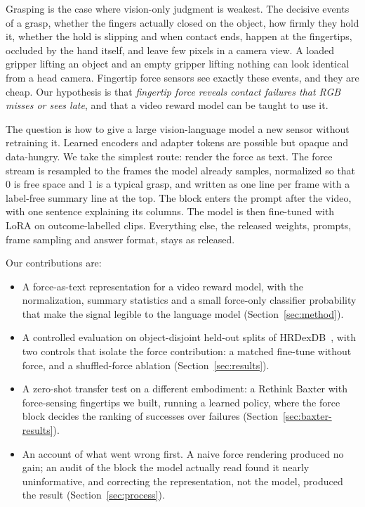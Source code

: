 \documentclass{article}
\begin{document}
Grasping is the case where vision-only judgment is weakest. The decisive events of a grasp, whether
the fingers actually closed on the object, how firmly they hold it, whether the hold is slipping
and when contact ends, happen at the fingertips, occluded by the hand itself, and leave few
pixels in a camera view. A loaded gripper lifting an object and an empty gripper lifting nothing
can look identical from a head camera. Fingertip force sensors see exactly these events, and they
are cheap. Our hypothesis is that \emph{fingertip force reveals contact failures that RGB misses or
sees late}, and that a video reward model can be taught to use it.

The question is how to give a large vision-language model a new sensor without retraining it.
Learned encoders and adapter tokens are possible but opaque and data-hungry. We take the
simplest route: render the force as text. The force stream is resampled to the frames the model
already samples, normalized so that 0 is free space and 1 is a typical grasp, and written as one
line per frame with a label-free summary line at the top. The block enters the prompt after the
video, with one sentence explaining its columns. The model is then fine-tuned with LoRA on
outcome-labelled clips. Everything else, the released weights, prompts, frame sampling and answer
format, stays as released.

Our contributions are:
\begin{itemize}
  \item A force-as-text representation for a video reward model, with the normalization,
  summary statistics and a small force-only classifier probability that make the signal legible
  to the language model (Section~\ref{sec:method}).
  \item A controlled evaluation on object-disjoint held-out splits of HRDexDB~\cite{hrdexdb2026},
  with two controls that isolate the force contribution: a matched fine-tune without force, and
  a shuffled-force ablation (Section~\ref{sec:results}).
  \item A zero-shot transfer test on a different embodiment: a Rethink Baxter with force-sensing
  fingertips we built, running a learned policy, where the force block decides the ranking of
  successes over failures (Section~\ref{sec:baxter-results}).
  \item An account of what went wrong first. A naive force rendering produced no gain; an audit of
  the block the model actually read found it nearly uninformative, and correcting the
  representation, not the model, produced the result (Section~\ref{sec:process}).
\end{itemize}
\end{document}
